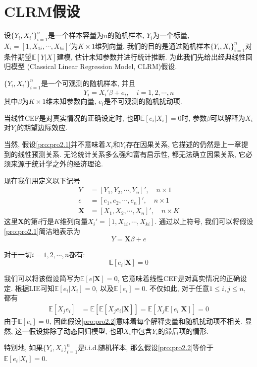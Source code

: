 \documentclass[cn, 12pt, math=mtpro2, bibstyle=apa, blue, twocol]{elegantbook}
\newcommand{\E}{\mathbb{E}}
\newcommand{\X}{\mathbold{X}}
\begin{document}
\section{CLRM假设}
设$\{Y_i,X_i'\}_{i=1}^n$是一个样本容量为$n$的随机样本, $Y_i$为一个标量, $X_i=[1,X_{1i},\cdots,X_{ki}]'$为$K\times 1$维列向量. 我们的目的是通过随机样本$\{Y_i,X_i\}_{i=1}^n$对条件期望$\E[Y|X]$建模, 估计未知参数并进行统计推断. 为此我们先给出经典线性回归模型 (Classical Linear Regression Model, CLRM)假设.

\begin{proposition}[线性]\label{pro:pro2.1}
$\{Y_i,X_i'\}_{i=1}^n$是一个可观测的随机样本, 并且
$$Y_i=X_i'\beta+e_i,\quad i=1,2,\cdots,n$$
其中$\beta$为$K\times1$维未知参数向量, $e_i$是不可观测的随机扰动项.
\end{proposition}
当线性CEF是对真实情况的正确设定时, 也即$\E[e_i|X_i]=0$时, 参数$\beta$可以解释为$X_i$对$Y_i$的期望边际效应.

当然, 假设\ref{pro:pro2.1}并不意味着$X_i$和$Y_i$存在因果关系, 它描述的仍然是上一章提到的线性预测关系. 无论统计关系多么强和富有启示性, 都无法确立因果关系, 它必须来源于统计学之外的经济理论.

现在我们用定义以下记号
\begin{align*}
Y&=[Y_1,Y_2,\cdots,Y_n]',\quad n\times1 \\
e&=[e_1,e_2,\cdots,e_n]',\quad n\times1 \\
\mathbold{X}&=[X_1,X_2,\cdots,X_n]',\quad n\times K
\end{align*}
这里$\mathbold{X}$的第$i$行是$K$维列向量$X_i'=[1,X_{1i},\cdots,X_{ki}]$. 通过以上符号, 我们可以将假设\ref{pro:pro2.1}简洁地表示为
$$Y=\mathbold{X}\beta+e$$

\begin{proposition}[严格外生性]\label{pro:pro2.2}
对于一切$ i=1,2,\cdots,n$都有:
$$\E[e_i|\mathbold{X}]=0$$
\end{proposition}
我们可以将该假设简写为$\E[e|\X]=0$, 它意味着线性CEF是对真实情况的正确设定. 根据LIE可知$\E[e_i|X_i]=0$, 以及$\E[e_i]=0$. 不仅如此, 对于任意$1\leq i, j\leq n$, 都有
\begin{align*}
\E[X_j e_i]&=\E[\E[X_j e_i|\mathbold{X}]]=\E[X_j\E[e_i|\mathbold{X}]]=0
\end{align*}
由于$\E[e_i]=0$, 因此假设\ref{pro:pro2.2}意味着每个解释变量和随机扰动项不相关. 显然, 这一假设排除了动态回归模型, 也即$X_i$中包含$Y_i$的滞后项的情形.

特别地, 如果$\{Y_i,X_i\}_{i=1}^n$是i.i.d.随机样本, 那么假设\ref{pro:pro2.2}等价于$\E[e_i|X_i]=0$.
\end{document}
